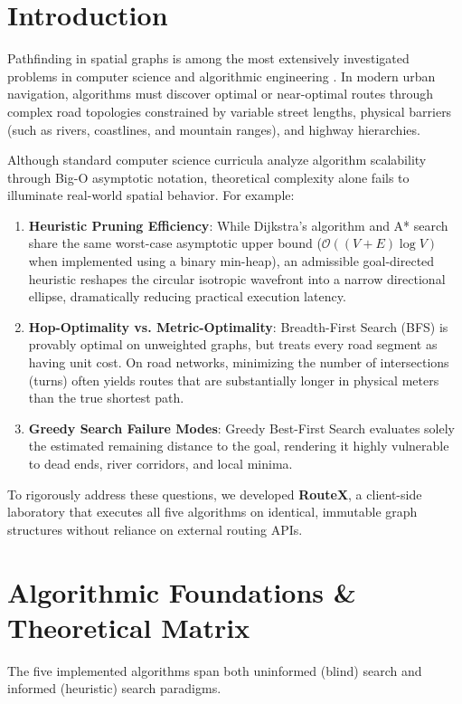 \documentclass[conference]{IEEEtran}
\begin{document}
\section{Introduction}
Pathfinding in spatial graphs is among the most extensively investigated problems in computer science and algorithmic engineering \cite{hart1968, dijkstra1959}. In modern urban navigation, algorithms must discover optimal or near-optimal routes through complex road topologies constrained by variable street lengths, physical barriers (such as rivers, coastlines, and mountain ranges), and highway hierarchies.

Although standard computer science curricula analyze algorithm scalability through Big-O asymptotic notation, theoretical complexity alone fails to illuminate real-world spatial behavior. For example:
\begin{enumerate}
    \item \textbf{Heuristic Pruning Efficiency}: While Dijkstra's algorithm and A* search share the same worst-case asymptotic upper bound ($\mathcal{O}((V+E)\log V)$ when implemented using a binary min-heap), an admissible goal-directed heuristic reshapes the circular isotropic wavefront into a narrow directional ellipse, dramatically reducing practical execution latency.
    \item \textbf{Hop-Optimality vs. Metric-Optimality}: Breadth-First Search (BFS) is provably optimal on unweighted graphs, but treats every road segment as having unit cost. On road networks, minimizing the number of intersections (turns) often yields routes that are substantially longer in physical meters than the true shortest path.
    \item \textbf{Greedy Search Failure Modes}: Greedy Best-First Search evaluates solely the estimated remaining distance to the goal, rendering it highly vulnerable to dead ends, river corridors, and local minima.
\end{enumerate}

To rigorously address these questions, we developed \textbf{RouteX}, a client-side laboratory that executes all five algorithms on identical, immutable graph structures without reliance on external routing APIs.

\section{Algorithmic Foundations \& Theoretical Matrix}
The five implemented algorithms span both uninformed (blind) search and informed (heuristic) search paradigms.
\end{document}
